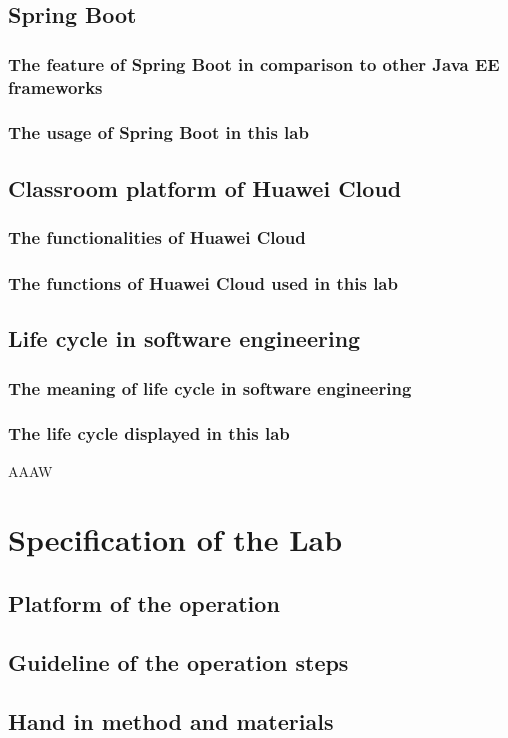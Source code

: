 \documentclass[a4paper]{report}
\begin{document}
\section{Spring Boot}
\subsection{The feature of Spring Boot in comparison to other Java EE frameworks}
\subsection{The usage of Spring Boot in this lab}
\section{Classroom platform of Huawei Cloud}
\subsection{The functionalities of Huawei Cloud}
\subsection{The functions of Huawei Cloud used in this lab}
\section{Life cycle in software engineering}
\subsection{The meaning of life cycle in software engineering}
\subsection{The life cycle displayed in this lab}
AAAW
\chapter{Specification of the Lab}
\section{Platform of the operation}
\section{Guideline of the operation steps}
\section{Hand in method and materials}
\end{document}
